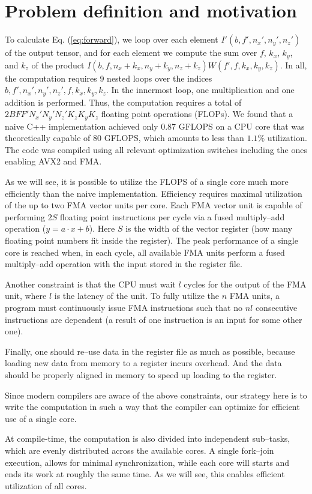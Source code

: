 \section{Problem definition and motivation}

  To calculate Eq. (\ref{eq:forward}), we loop over each element
  $I'(b,f',n_x',n_y',n_z')$ of the output tensor, and for each element
  we compute the sum over $f$, $k_x$, $k_y$, and $k_z$ of the product
  $I(b,f,n_x+k_x,n_y+k_y,n_z+k_z) W(f',f,k_x,k_y,k_z)$.  In all, the
  computation requires 9 nested loops over the indices
  $b,f',n_x',n_y',n_z',f,k_x,k_y,k_z$.  In the innermost loop, one
  multiplication and one addition is performed.  Thus, the computation
  requires a total of $2BFF'N_x'N_y'N_z'K_zK_yK_z$ floating point
  operations (FLOPs).  We found that a naive C++ implementation
  achieved only $0.87$ GFLOPS on a CPU core that was theoretically
  capable of $80$ GFLOPS, which amounts to less than $1.1\%$
  utilization.  The code was compiled using all relevant optimization
  switches including the ones enabling AVX2 and FMA.

  As we will see, it is possible to utilize the FLOPS of a single core
  much more efficiently than the naive implementation.  Efficiency
  requires maximal utilization of the up to two FMA vector units per
  core.  Each FMA vector unit is capable of performing $2S$ floating
  point instructions per cycle via a fused multiply--add operation ($y
  = a\cdot x + b$).  Here $S$ is the width of the vector register (how
  many floating point numbers fit inside the register).  The peak
  performance of a single core is reached when, in each cycle, all
  available FMA units perform a fused multiply--add operation with the
  input stored in the register file.

  Another constraint is that the CPU must wait $l$ cycles for the
  output of the FMA unit, where $l$ is the latency of the unit.  To
  fully utilize the $n$ FMA units, a program must continuously issue
  FMA instructions such that no $nl$ consecutive instructions are
  dependent (a result of one instruction is an input for some other
  one).

  Finally, one should re--use data in the register file as much as
  possible, because loading new data from memory to a register incurs
  overhead.  And the data should be properly aligned in memory to
  speed up loading to the register.

  Since modern compilers are aware of the above constraints, our
  strategy here is to write the computation in such a way that the
  compiler can optimize for efficient use of a single core.

  At compile-time, the computation is also divided into independent
  sub--tasks, which are evenly distributed across the available
  cores. A single fork--join execution, allows for minimal
  synchronization, while each core will starts and ends its work at
  roughly the same time.  As we will see, this enables efficient
  utilization of all cores.
